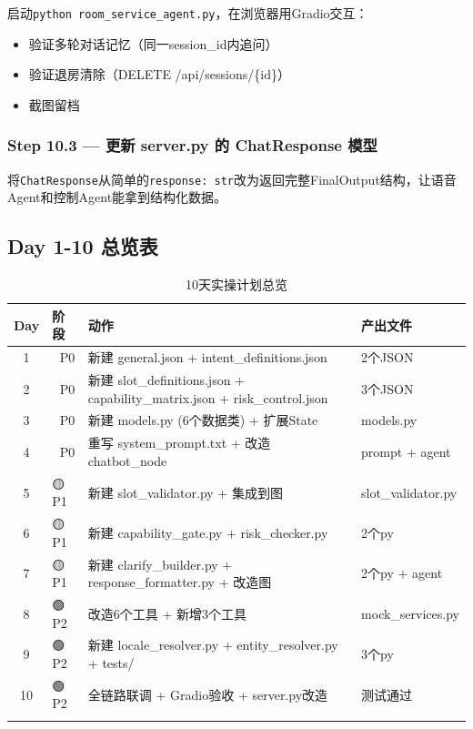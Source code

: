 \documentclass[12pt,a4paper]{ctexart}
\begin{document}
启动\texttt{python room\_service\_agent.py}，在浏览器用Gradio交互：

\begin{itemize}
    \item 验证多轮对话记忆（同一session\_id内追问）
    \item 验证退房清除（DELETE /api/sessions/\{id\}）
    \item 截图留档
\end{itemize}

\subsubsection*{Step 10.3 — 更新 server.py 的 ChatResponse 模型}

将\texttt{ChatResponse}从简单的\texttt{response: str}改为返回完整FinalOutput结构，让语音Agent和控制Agent能拿到结构化数据。

\newpage

\subsection{Day 1-10 总览表}

\begin{longtable}{@{}cllp{4.5cm}@{}}
\toprule
\textbf{Day} & \textbf{阶段} & \textbf{动作} & \textbf{产出文件} \\
\midrule
\endhead
1 & 🔴 P0 & 新建 general.json + intent\_definitions.json & 2个JSON \\
2 & 🔴 P0 & 新建 slot\_definitions.json + capability\_matrix.json + risk\_control.json & 3个JSON \\
3 & 🔴 P0 & 新建 models.py (6个数据类) + 扩展State & models.py \\
4 & 🔴 P0 & 重写 system\_prompt.txt + 改造 chatbot\_node & prompt + agent \\
5 & 🟡 P1 & 新建 slot\_validator.py + 集成到图 & slot\_validator.py \\
6 & 🟡 P1 & 新建 capability\_gate.py + risk\_checker.py & 2个py \\
7 & 🟡 P1 & 新建 clarify\_builder.py + response\_formatter.py + 改造图 & 2个py + agent \\
8 & 🟢 P2 & 改造6个工具 + 新增3个工具 & mock\_services.py \\
9 & 🟢 P2 & 新建 locale\_resolver.py + entity\_resolver.py + tests/ & 3个py \\
10 & 🟢 P2 & 全链路联调 + Gradio验收 + server.py改造 & 测试通过 \\
\bottomrule
\caption{10天实操计划总览}
\end{longtable}
\end{document}
